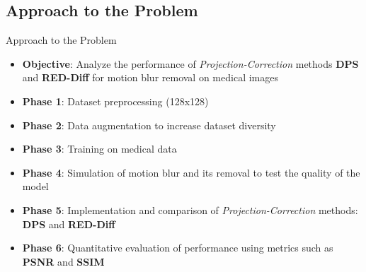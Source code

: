 \subsection{Approach to the Problem}
\begin{frame}{Approach to the Problem}
  \begin{itemize}
    \item \textbf{Objective}: Analyze the performance of \textit{Projection-Correction} methods \textbf{DPS} and \textbf{RED-Diff} for motion blur removal on medical images
    \item \textbf{Phase 1}: Dataset preprocessing (128x128)
    \item \textbf{Phase 2}: Data augmentation to increase dataset diversity
    \item \textbf{Phase 3}: Training on medical data
    \item \textbf{Phase 4}: Simulation of motion blur and its removal to test the quality of the model
    \item \textbf{Phase 5}: Implementation and comparison of \textit{Projection-Correction} methods: \textbf{DPS} and \textbf{RED-Diff}
    \item \textbf{Phase 6}: Quantitative evaluation of performance using metrics such as \textbf{PSNR} and \textbf{SSIM}
  \end{itemize}
\end{frame}